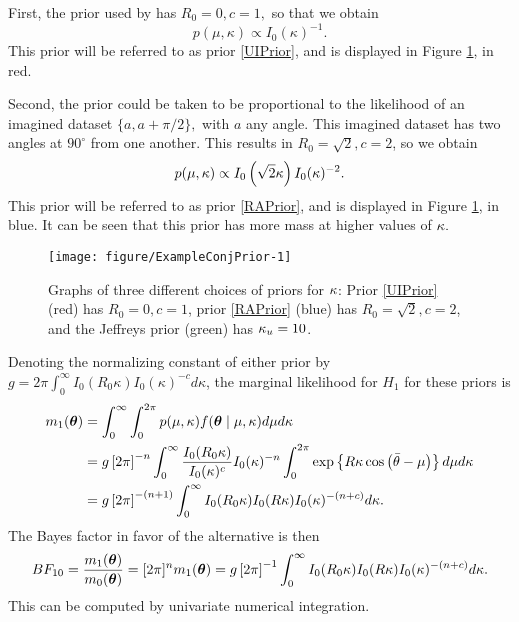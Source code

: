 First, the prior used by \citet{mcvinish2008semiparametric} has \( R_0 = 0, c = 1, \) so that we obtain
\begin{equation} \label{UIPrior} %
p(\mu, \kappa) \propto I_0(\kappa)^{-1}.
\end{equation}
This prior will be referred to as prior \ref{UIPrior}, and is displayed in Figure \ref{fig:exampleprior}, in red.

Second, the prior could be taken to be proportional to the likelihood of an imagined dataset \( \{ a, a + \pi/2 \},\) with \( a \) any angle. This imagined dataset has two angles at \( 90^\circ \) from one another. This results in \( R_0 = \sqrt{2}, c = 2 \), so we obtain
\begin{equation} \label{RAPrior} %
p(\mu, \kappa) \propto I_0\left(\sqrt{2} \kp \right) I_0(\kappa)^{-2}.
\end{equation}
This prior will be referred to as prior \ref{RAPrior}, and is displayed in Figure \ref{fig:exampleprior}, in blue. It can be seen that this prior has more mass at higher values of \( \kappa.\)


\begin{figure}
\begin{center}
\begin{knitrout}
\color{fgcolor}
\texttt{[image: figure/ExampleConjPrior-1]} 

\end{knitrout}
\end{center}
\caption{Graphs of three different choices of priors for \(\kappa\): Prior \ref{UIPrior} (red) has \( R_0 = 0, c = 1\), prior \ref{RAPrior} (blue) has \( R_0 = \sqrt{2}, c = 2\), and the Jeffreys prior (green) has \( \kappa_u = 10\).}
\label{fig:exampleprior}
\end{figure}

Denoting the normalizing constant of either prior by \( g = 2 \pi \int_0^{\infty} I_0(R_0 \kappa)I_0(\kappa)^{-c} d\kappa \), the marginal likelihood for \( H_1 \) for these priors is
\begin{align}
m_1(\boldsymbol{\theta}) &= \int_0^{\infty}  \int_0^{2\pi} p(\mu, \kappa ) f (\boldsymbol{\theta} \mid \mu, \kappa)  d\mu d\kappa \\
&= g \left[ 2 \pi \right]^{-n} \int_0^{\infty}  \frac{I_0(R_0 \kappa)}{I_0(\kappa)^{c}}  I_0 (\kappa)^{-n} \int_0^{2\pi} \exp \left\{ R \kappa \cos \left( \bar{\theta} - \mu \right) \right\}  d\mu d\kappa \\
&= g \left[ 2 \pi \right]^{-(n + 1)}  \int_0^{\infty}   I_0(R_0 \kappa) I_0(R \kappa) I_0(\kappa)^{-(n + c)}   d\kappa.
\end{align}
The Bayes factor in favor of the alternative is then
\begin{equation}
  BF_{10} = \frac{m_1(\boldsymbol{\theta}) }{m_0(\boldsymbol{\theta})} = [2 \pi]^n m_1(\boldsymbol{\theta}) = g \left[ 2 \pi \right]^{-1}  \int_0^{\infty}   I_0(R_0 \kappa) I_0(R \kappa) I_0(\kappa)^{-(n + c)} d\kappa.
\end{equation}
This can be computed by univariate numerical integration.

